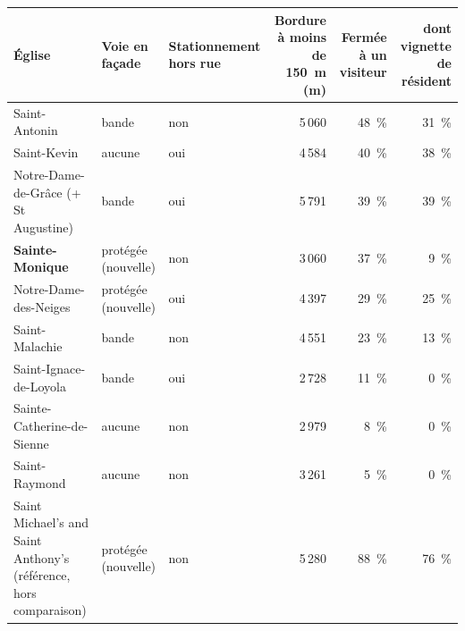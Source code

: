 \begin{tabular}{@{}>{\raggedright\arraybackslash}p{4.6cm}>{\raggedright\arraybackslash}p{2.6cm}>{\raggedright\arraybackslash}p{1.7cm}rrr@{}}\toprule
Église & Voie en façade & Stationnement hors rue & Bordure à moins de 150~m (m) & Fermée à un visiteur & dont vignette de résident \\\midrule
Saint-Antonin & bande & non & 5\,060 & 48~\% & 31~\% \\
Saint-Kevin & aucune & oui & 4\,584 & 40~\% & 38~\% \\
Notre-Dame-de-Grâce (+ St Augustine) & bande & oui & 5\,791 & 39~\% & 39~\% \\
\textbf{Sainte-Monique} & protégée (nouvelle) & non & 3\,060 & 37~\% & 9~\% \\
Notre-Dame-des-Neiges & protégée (nouvelle) & oui & 4\,397 & 29~\% & 25~\% \\
Saint-Malachie & bande & non & 4\,551 & 23~\% & 13~\% \\
Saint-Ignace-de-Loyola & bande & oui & 2\,728 & 11~\% & 0~\% \\
Sainte-Catherine-de-Sienne & aucune & non & 2\,979 & 8~\% & 0~\% \\
Saint-Raymond & aucune & non & 3\,261 & 5~\% & 0~\% \\
\midrule
Saint Michael's and Saint Anthony's (référence, hors comparaison) & protégée (nouvelle) & non & 5\,280 & 88~\% & 76~\% \\
\bottomrule
\end{tabular}
